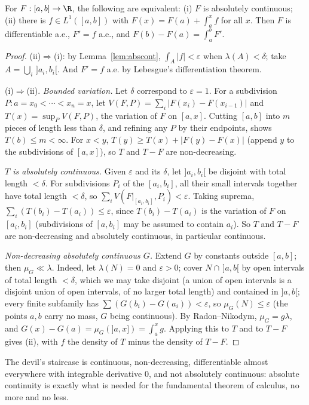 \begin{theorem}\label{thm:ftc}
For $F:[a,b]\to\R$, the following are equivalent: (i) $F$ is absolutely continuous; (ii) there is $f\in L^1([a,b])$ with $F(x)=F(a)+\int_a^xf$ for all $x$. Then $F$ is differentiable a.e., $F'=f$ a.e., and
$F(b)-F(a)=\int_a^bF'$.
\end{theorem}
\begin{proof}
(ii)$\Rightarrow$(i): by Lemma~\ref{lem:abscont}, $\int_A|f|<\varepsilon$ when $\lambda(A)<\delta$; take $A=\bigcup_i\,]a_i,b_i[$. And $F'=f$ a.e. by Lebesgue's differentiation theorem.

(i)$\Rightarrow$(ii). \emph{Bounded variation.} Let $\delta$ correspond to $\varepsilon=1$. For a subdivision $P:a=x_0<\cdots<x_n=x$, let $V(F,P)=\sum_i|F(x_i)-F(x_{i-1})|$ and $T(x)=\sup_PV(F,P)$, the variation of $F$ on $[a,x]$.
Cutting $[a,b]$ into $m$ pieces of length less than $\delta$, and refining any $P$ by their endpoints, shows $T(b)\le m<\infty$. For $x<y$, $T(y)\ge T(x)+|F(y)-F(x)|$ (append $y$ to the subdivisions of $[a,x]$), so
$T$ and $T-F$ are non-decreasing.

\emph{$T$ is absolutely continuous.} Given $\varepsilon$ and its $\delta$, let $]a_i,b_i[$ be disjoint with total length $<\delta$. For subdivisions $P_i$ of the $[a_i,b_i]$, all their small intervals together have total length
$<\delta$, so $\sum_iV(F|_{[a_i,b_i]},P_i)<\varepsilon$. Taking suprema, $\sum_i(T(b_i)-T(a_i))\le\varepsilon$, since $T(b_i)-T(a_i)$ is the variation of $F$ on $[a_i,b_i]$ (subdivisions of $[a,b_i]$ may be assumed to contain $a_i$).
So $T$ and $T-F$ are non-decreasing and absolutely continuous, in particular continuous.

\emph{Non-decreasing absolutely continuous $G$.} Extend $G$ by constants outside $[a,b]$; then $\mu_G\ll\lambda$. Indeed, let $\lambda(N)=0$ and $\varepsilon>0$; cover $N\cap\,]a,b[$ by open intervals of total length $<\delta$, which we may
take disjoint (a union of open intervals is a disjoint union of open intervals, of no larger total length) and contained in $]a,b[$; every finite subfamily has $\sum(G(b_i)-G(a_i))<\varepsilon$, so $\mu_G(N)\le\varepsilon$ (the points
$a,b$ carry no mass, $G$ being continuous). By Radon--Nikodym, $\mu_G=g\lambda$, and $G(x)-G(a)=\mu_G(]a,x])=\int_a^xg$. Applying this to $T$ and to $T-F$ gives (ii), with $f$ the density of $T$ minus the density of $T-F$.
\end{proof}

The devil's staircase is continuous, non-decreasing, differentiable almost everywhere with integrable derivative $0$, and not absolutely continuous: absolute continuity is exactly what is needed
for the fundamental theorem of calculus, no more and no less.

